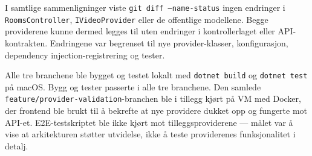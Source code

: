 I samtlige sammenligninger viste \texttt{git diff --name-status}
ingen endringer i \texttt{RoomsController}, \texttt{IVideoProvider}
eller de offentlige modellene. Begge providerene kunne dermed legges
til uten endringer i kontrollerlaget eller API-kontrakten.
Endringene var begrenset til nye provider-klasser, konfigurasjon,
dependency injection-registrering og tester.

Alle tre branchene ble bygget og testet lokalt med
\texttt{dotnet build} og \texttt{dotnet test} på macOS. Bygg og
tester passerte i alle tre branchene. Den samlede
\texttt{feature/provider-validation}-branchen ble i tillegg kjørt
på VM med Docker, der frontend ble brukt til å bekrefte at nye
providere dukket opp og fungerte mot API-et. E2E-testskriptet ble
ikke kjørt mot tilleggsproviderene — målet var å vise at
arkitekturen støtter utvidelse, ikke å teste providerenes
funksjonalitet i detalj.